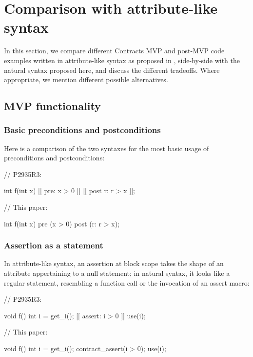 
\section{Comparison with attribute-like syntax}

In this section, we compare different Contracts MVP and post-MVP code examples written in attribute-like syntax as proposed in \cite{P2935R3}, side-by-side with the natural syntax proposed here, and discuss the different tradeoffs. Where appropriate, we mention different possible alternatives.

\subsection{MVP functionality}

\subsubsection{Basic preconditions and postconditions}
Here is a comparison of the two syntaxes for the most basic usage of preconditions and postconditions:


\begin{minipage}{8cm}
\begin{codeblock}
// P2935R3:

int f(int x) 
  [[ pre: x > 0 ]]
  [[ post r: r > x ]];
\end{codeblock}
\end{minipage}
\begin{minipage}{8cm}
\begin{codeblock}
// This paper:

int f(int x) 
  pre (x > 0)
  post (r: r > x);
\end{codeblock}
\end{minipage}

\subsubsection{Assertion as a statement}

In attribute-like syntax, an assertion at block scope takes the shape of an attribute appertaining to a null statement; in natural syntax, it looks like a regular statement, resembling a function call or the invocation of an assert macro:

\begin{minipage}{8cm}
\begin{codeblock}
// P2935R3:

void f() {
  int i = get_i();
  [[ assert: i > 0 ]]
  use(i);
}
\end{codeblock}
\end{minipage}
\begin{minipage}{8cm}
\begin{codeblock}
// This paper:

void f() {
  int i = get_i();
  contract_assert(i > 0);
  use(i);
}
\end{codeblock}
\end{minipage}


